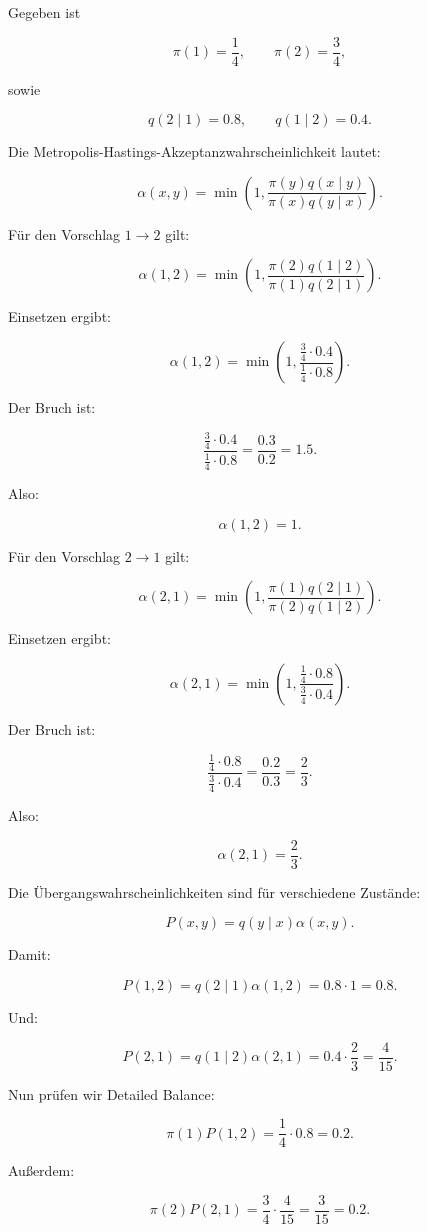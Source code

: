 \documentclass[11pt,a4paper]{article}
\begin{document}
Gegeben ist

\[
\pi(1)=\frac14,
\qquad
\pi(2)=\frac34,
\]

sowie

\[
q(2\mid 1)=0.8,
\qquad
q(1\mid 2)=0.4.
\]

Die Metropolis-Hastings-Akzeptanzwahrscheinlichkeit lautet:

\[
\alpha(x,y)
=
\min\left(
1,
\frac{\pi(y)q(x\mid y)}{\pi(x)q(y\mid x)}
\right).
\]

Für den Vorschlag $1\to 2$ gilt:

\[
\alpha(1,2)
=
\min\left(
1,
\frac{\pi(2)q(1\mid 2)}{\pi(1)q(2\mid 1)}
\right).
\]

Einsetzen ergibt:

\[
\alpha(1,2)
=
\min\left(
1,
\frac{\frac34\cdot 0.4}{\frac14\cdot 0.8}
\right).
\]

Der Bruch ist:

\[
\frac{\frac34\cdot 0.4}{\frac14\cdot 0.8}
=
\frac{0.3}{0.2}
=
1.5.
\]

Also:

\[
\alpha(1,2)=1.
\]

Für den Vorschlag $2\to 1$ gilt:

\[
\alpha(2,1)
=
\min\left(
1,
\frac{\pi(1)q(2\mid 1)}{\pi(2)q(1\mid 2)}
\right).
\]

Einsetzen ergibt:

\[
\alpha(2,1)
=
\min\left(
1,
\frac{\frac14\cdot 0.8}{\frac34\cdot 0.4}
\right).
\]

Der Bruch ist:

\[
\frac{\frac14\cdot 0.8}{\frac34\cdot 0.4}
=
\frac{0.2}{0.3}
=
\frac23.
\]

Also:

\[
\alpha(2,1)=\frac23.
\]

Die Übergangswahrscheinlichkeiten sind für verschiedene Zustände:

\[
P(x,y)=q(y\mid x)\alpha(x,y).
\]

Damit:

\[
P(1,2)=q(2\mid 1)\alpha(1,2)=0.8\cdot 1=0.8.
\]

Und:

\[
P(2,1)=q(1\mid 2)\alpha(2,1)=0.4\cdot \frac23=\frac{4}{15}.
\]

Nun prüfen wir Detailed Balance:

\[
\pi(1)P(1,2)
=
\frac14\cdot 0.8
=
0.2.
\]

Außerdem:

\[
\pi(2)P(2,1)
=
\frac34\cdot \frac{4}{15}
=
\frac{3}{15}
=
0.2.
\]
\end{document}
